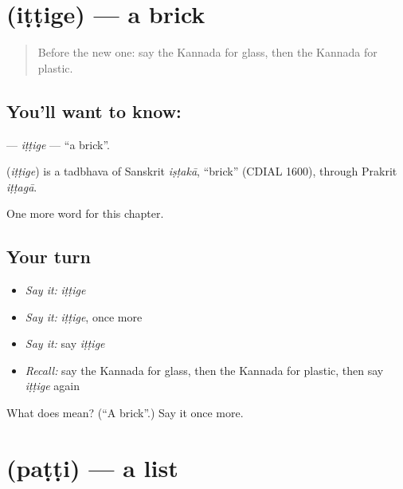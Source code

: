 \section[\texorpdfstring{\kn{ಇಟ್ಟಿಗೆ} (iṭṭige)}{ಇಟ್ಟಿಗೆ (iṭṭige)}]{ (iṭṭige) — a brick}

\label{lesson:KA-C301-ittige}



\begin{quote}
Before the new one: say the Kannada for glass, then the Kannada for plastic.
\end{quote}

\subsection*{You'll want to know: }
\textbf{} — \emph{iṭṭige} — \textquotedblleft{}a brick\textquotedblright{}.

\begin{cousinweb}
\textbf{} (\emph{iṭṭige}) is a tadbhava of Sanskrit \emph{iṣṭakā}, \textquotedblleft{}brick\textquotedblright{} (CDIAL 1600), through Prakrit \emph{iṭṭagā}.
\end{cousinweb}

\begin{grammarlens}[title={What you've built}]
One more word for this chapter.
\end{grammarlens}

\subsection*{Your turn}
\begin{itemize}
\raggedright
  \item \emph{Say it:} \emph{iṭṭige}
  \item \emph{Say it:} \emph{iṭṭige}, once more
  \item \emph{Say it:} say \emph{iṭṭige}
  \item \emph{Recall:} say the Kannada for glass, then the Kannada for plastic, then say \emph{iṭṭige} again
\end{itemize}

\begin{tcolorbox}[breakable,colback=teal!4,colframe=teal!35!black,title={Before you move on}]
What does  mean? (\textquotedblleft{}A brick\textquotedblright{}.) Say it once more.
\end{tcolorbox}
\section[\texorpdfstring{\kn{ಪಟ್ಟಿ} (paṭṭi)}{ಪಟ್ಟಿ (paṭṭi)}]{ (paṭṭi) — a list}

